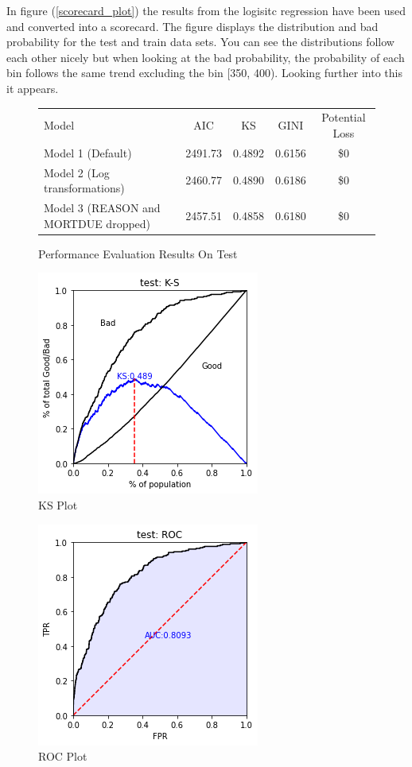 In figure (\ref{scorecard_plot}) the results from the logisitc regression have been used and converted into a scorecard. The figure displays the distribution and bad probability for the test and train data sets. You can see the distributions follow each other nicely but when looking at the bad probability, the probability of each bin follows the same trend excluding the bin [350, 400). Looking further into this it appears.

\begin{figure}
\begin{center}
\renewcommand{\arraystretch}{1.25}
\begin{tabular}{lcccc}
\toprule
Model & AIC & KS & GINI & Potential Loss \\
Model 1 (Default) & 2491.73 & 0.4892 & 0.6156 & \$0 \\
Model 2 (Log transformations) & 2460.77 & 0.4890 & 0.6186 & \$0 \\
Model 3 (REASON and MORTDUE dropped) & 2457.51 & 0.4858 & 0.6180 & \$0 \\
\bottomrule
\end{tabular}
\caption{Performance Evaluation Results On Test \label{perf_eval}}
\end{center}
\end{figure}

\begin{figure}[!ht]
	\centering
	\includegraphics[scale=0.90]{figs/ks_plot.png}
	\caption{KS Plot \label{ks_plot}}
\end{figure}

\begin{figure}[!ht]
	\centering
	\includegraphics[scale=0.90]{figs/roc_plot.png}
	\caption{ROC Plot \label{roc_plot}}
\end{figure}

